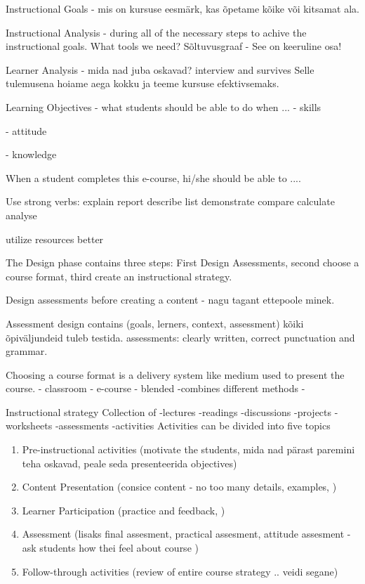 Instructional Goals - mis on kursuse eesmärk, kas õpetame kõike või kitsamat ala. 

Instructional Analysis - during all of the necessary steps to achive the instructional goals. What tools we need? Sõltuvusgraaf - See on keeruline osa!

Learner Analysis - mida nad juba oskavad? interview and survives Selle tulemusena hoiame aega kokku ja teeme kursuse efektivsemaks.

Learning Objectives - what students should be able to do when ...
- skills 

- attitude

- knowledge

When a student completes this e-course, hi/she should be able to ....

Use strong verbs:
explain
report
describe
list
demonstrate
compare
calculate
analyse

utilize resources better


The Design phase contains three steps: First Design Assessments, second choose a course format, third create an instructional strategy.

Design assessments before creating a content - nagu tagant ettepoole minek.

Assessment design contains (goals, lerners, context, assessment)
kõiki õpiväljundeid tuleb testida.
assessments: clearly written, correct punctuation and grammar.

Choosing a course format is a delivery system like medium used to present the course.
- classroom
- e-course
- blended -combines different methods
- 

Instructional strategy
Collection of 
-lectures
-readings
-discussions
-projects
-worksheets
-assessments
-activities
Activities can be divided into five topics
\begin{enumerate}
\item Pre-instructional activities (motivate the students, mida nad pärast paremini teha oskavad, peale seda presenteerida objectives)
\item Content Presentation (consice content - no too many details, examples, )
\item Learner Participation (practice and feedback, )
\item Assessment (lisaks final assesment, practical assesment, attitude assesment  - ask students how thei feel about course )
\item Follow-through activities (review of entire course strategy .. veidi segane)
\end{enumerate}

